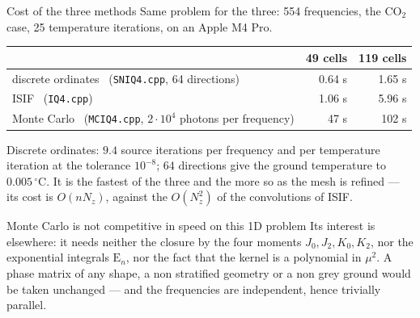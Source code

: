 \documentclass[aspectratio=169,10pt]{beamer}
\newcommand{\E}{\mathrm{E}}
\begin{document}
\begin{frame}{Cost of the three methods}
Same problem for the three: 554 frequencies, the CO$_2$ case, 25 temperature iterations,
on an Apple M4 Pro.
\begin{center}
\begin{tabular}{lrr}\toprule
& 49 cells & 119 cells\\\midrule
discrete ordinates \ \small(\texttt{SNIQ4.cpp}, 64 directions) & 0.64 s & 1.65 s\\
ISIF \ \small(\texttt{IQ4.cpp}) & 1.06 s & 5.96 s\\
Monte Carlo \ \small(\texttt{MCIQ4.cpp}, $2\cdot10^4$ photons per frequency) & 47 s & 102 s\\
\bottomrule
\end{tabular}
\end{center}
\medskip

Discrete ordinates: $9.4$ source iterations per frequency and per temperature iteration at
the tolerance $10^{-8}$; 64 directions give the ground temperature to $0.005\,^\circ$C. It
is the fastest of the three and the more so as the mesh is refined --- its cost is
$O(nN_z)$, against the $O(N_z^2)$ of the convolutions of ISIF.
\medskip

\begin{block}{Monte Carlo is not competitive in speed on this 1D problem}
Its interest is elsewhere: it needs neither the closure by the four moments
$J_0,J_2,K_0,K_2$, nor the exponential integrals $\E_n$, nor the fact that the kernel is a
polynomial in $\mu^2$. A phase matrix of any shape, a non stratified geometry or a non grey
ground would be taken unchanged --- and the frequencies are independent, hence trivially
parallel.
\end{block}
\end{frame}
\end{document}
